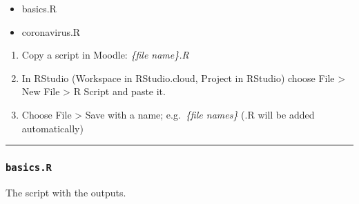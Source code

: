 \documentclass[
]{article}
\providecommand{\tightlist}{%
  \setlength{\itemsep}{0pt}\setlength{\parskip}{0pt}}
\begin{document}
\begin{itemize}
\tightlist
\item
  basics.R
\item
  coronavirus.R
\end{itemize}

\begin{enumerate}
\def\labelenumi{\arabic{enumi}.}
\tightlist
\item
  Copy a script in Moodle: \emph{\{file name\}.R}
\item
  In RStudio (Workspace in RStudio.cloud, Project in RStudio) choose
  File \textgreater{} New File \textgreater{} R Script and paste it.
\item
  Choose File \textgreater{} Save with a name; e.g.~\emph{\{file
  names\}} (.R will be added automatically)
\end{enumerate}

\begin{center}\rule{0.5\linewidth}{0.5pt}\end{center}

\hypertarget{basics.r}{%
\subsubsection{\texorpdfstring{\texttt{basics.R}}{basics.R}}\label{basics.r}}

The script with the outputs.
\end{document}
